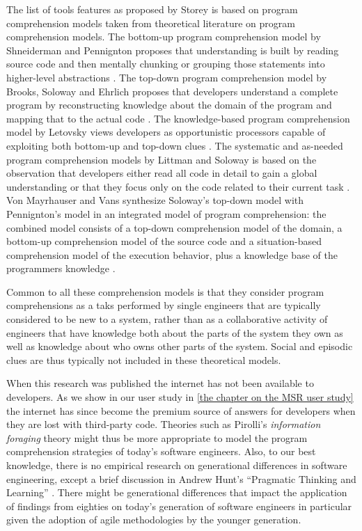 The list of tools features as proposed by Storey \etal is based on program comprehension models taken from theoretical literature on program comprehension models.
%
The bottom-up program comprehension model by Shneiderman and Pennignton proposes that understanding is built by reading source code and then mentally chunking  or grouping those statements into higher-level abstractions \cite{Shne80a,Penn87a}. 
%
The top-down program comprehension model by Brooks, Soloway and Ehrlich proposes that developers understand a complete program by reconstructing knowledge about the domain of the program and mapping that to the actual code \cite{Broo83b, Solo86a}. 
% 
The knowledge-based program comprehension model by Letovsky views developers as opportunistic processors capable of exploiting both bottom-up and top-down clues \cite{Leto86a}. 
%
The systematic and as-needed program comprehension models by Littman and Soloway is based on the  observation that developers either read all code in detail to gain a global understanding or that they focus only on the code related to their current task \cite{Litt86a}.
%
Von Mayrhauser and Vans synthesize Soloway's top-down model with Pennignton's model in an integrated model of program comprehension: the combined model consists of a top-down comprehension model of the domain, a bottom-up comprehension model of the source code and a situation-based comprehension model of the execution behavior, plus a knowledge base of the programmers knowledge \cite{Mayr94a}. 

Common to all these comprehension models is that they consider program comprehensions as a taks performed by single engineers that are typically considered to be new to a system, rather than as a collaborative activity of engineers that have knowledge both about the parts of the system they own as well as knowledge about who owns other parts of the system. Social and episodic clues are thus typically not included in these theoretical models.

When this research was published the internet has not been available to developers. As we show in our user study in \autoref{the chapter on the MSR user study} the internet has since become the premium source of answers for developers when they are lost with third-party code. Theories such as Pirolli's \emph{information foraging} theory \cite{Piro95a,Piro09a} might thus be more appropriate to model the program comprehension strategies of today's software engineers. Also, to our best knowledge, there is no empirical research on generational differences in software engineering, except a brief discussion in Andrew Hunt's ``Pragmatic Thinking and Learning'' \cite{Hunt08a}. There might be generational differences that impact the application of findings from eighties on today's generation of software engineers in particular given the adoption of agile methodologies by the younger generation.

